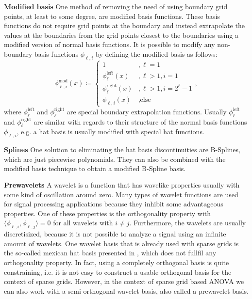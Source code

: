 \documentclass[
  a4paper,  %
  twoside,  %
  bibliography=totoc,
  headsepline,
  cleardoublepage=empty,
  parskip=half,
  draft=false
]{scrbook}
\begin{document}
\vspace{0.3em}
\textbf{Modified basis }
One method of removing the need of using boundary grid points, at least to some degree, are modified basis functions.
These basis functions do not require grid points at the boundary and instead extrapolate the values at the boundaries from the grid points closest to the boundaries using a modified version of normal basis functions.
It is possible to modify any non-boundary basis functions $\phi_{\ell,i}$ by defining the modified basis as follows:
\begin{equation}
\phi^{\text{mod}}_{\ell,i}(x) \coloneqq
\begin{cases}
1 &, \ell=1\\
\phi^{\text{left}}_{\ell}(x)&, \ell>1, i=1\\
\phi^{\text{right}}_{\ell}(x)&, \ell>1, i=2^\ell - 1\\
\phi_{\ell,i}(x)&, \text{else}
\end{cases},
\nonumber
\end{equation}
where $\phi^{\text{left}}_{\ell}$ and $\phi^{\text{right}}_{\ell}$ are special boundary extrapolation functions.
Usually $\phi^{\text{left}}_{\ell}$ and $\phi^{\text{right}}_{\ell}$ are similar with regards to their structure of the normal basis functions $\phi_{\ell,i}$, e.g. a hat basis is usually modified with special hat functions.

\vspace{0.3em}
\textbf{Splines }
One solution to eliminating the hat basis discontinuities are B-Splines, which are just piecewise polynomials.
They can also be combined with the modified basis technique to obtain a modified B-Spline basis.

\vspace{0.3em}
\textbf{Prewavelets }
A wavelet is a function that has wavelike properties usually with some kind of oscillation around zero.
Many types of wavelet functions are used for signal processing applications because they inhibit some advantageous properties.
One of these properties is the orthogonality property with $\langle \phi_{\ell, i},\phi_{\ell, j} \rangle = 0$ for all wavelets with $i \neq j$.
Furthermore, the wavelets are usually discretisized, because it is not possible to analyze a signal using an infinite amount of wavelets.
One wavelet basis that is already used with sparse grids is the so-called mexican hat basis presented in \cite{}, which does not fullfil any orthogonality property.
In fact, using a completely orthogonal basis is quite constraining, i.e. it is not easy to construct a usable orthogonal basis for the context of sparse grids.
However, in the context of sparse grid based ANOVA we can also work with a semi-orthogonal wavelet basis, also called a prewavelet basis.
\end{document}
